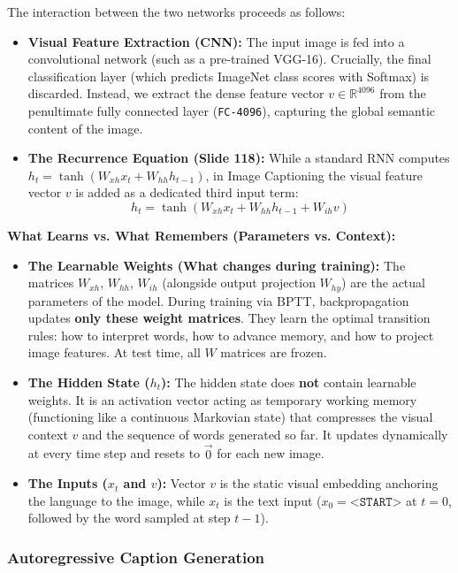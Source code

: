 The interaction between the two networks proceeds as follows:
\begin{itemize}[leftmargin=*]
    \item \textbf{Visual Feature Extraction (CNN):} The input image is fed into a convolutional network (such as a pre-trained VGG-16). Crucially, the final classification layer (which predicts ImageNet class scores with Softmax) is discarded. Instead, we extract the dense feature vector $v \in \mathbb{R}^{4096}$ from the penultimate fully connected layer (\texttt{FC-4096}), capturing the global semantic content of the image.
    \item \textbf{The Recurrence Equation (Slide 118):} While a standard RNN computes $h_t = \tanh(W_{xh} x_t + W_{hh} h_{t-1})$, in Image Captioning the visual feature vector $v$ is added as a dedicated third input term:
    \[ h_t = \tanh(W_{xh} x_t + W_{hh} h_{t-1} + W_{ih} v) \]
\end{itemize}

\begin{Notebox}
    \textbf{What Learns vs. What Remembers (Parameters vs. Context):}
    \begin{itemize}[nosep]
        \item \textbf{The Learnable Weights (What changes during training):} The matrices $W_{xh}$, $W_{hh}$, $W_{ih}$ (alongside output projection $W_{hy}$) are the actual parameters of the model. During training via BPTT, backpropagation updates \textbf{only these weight matrices}. They learn the optimal transition rules: how to interpret words, how to advance memory, and how to project image features. At test time, all $W$ matrices are frozen.
        \item \textbf{The Hidden State ($h_t$):} The hidden state does \textbf{not} contain learnable weights. It is an activation vector acting as temporary working memory (functioning like a continuous Markovian state) that compresses the visual context $v$ and the sequence of words generated so far. It updates dynamically at every time step and resets to $\vec{0}$ for each new image.
        \item \textbf{The Inputs ($x_t$ and $v$):} Vector $v$ is the static visual embedding anchoring the language to the image, while $x_t$ is the text input ($x_0 = \texttt{<START>}$ at $t=0$, followed by the word sampled at step $t-1$).
    \end{itemize}
\end{Notebox}

\subsubsection{Autoregressive Caption Generation}

